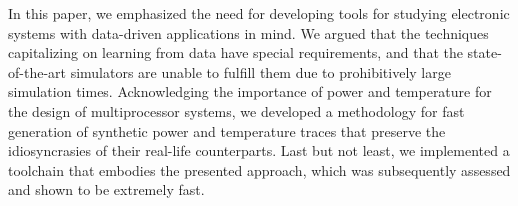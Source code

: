 In this paper, we emphasized the need for developing tools for studying
electronic systems with data-driven applications in mind. We argued that the
techniques capitalizing on learning from data have special requirements, and
that the state-of-the-art simulators are unable to fulfill them due to
prohibitively large simulation times. Acknowledging the importance of power and
temperature for the design of multiprocessor systems, we developed a methodology
for fast generation of synthetic power and temperature traces that preserve the
idiosyncrasies of their real-life counterparts. Last but not least, we
implemented a toolchain that embodies the presented approach, which was
subsequently assessed and shown to be extremely fast.
